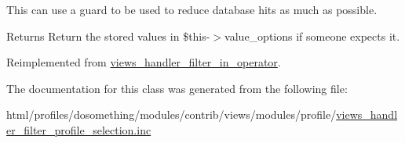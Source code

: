 This can use a guard to be used to reduce database hits as much as possible.

\begin{DoxyReturn}{Returns}
Return the stored values in \$this-\/$>$value\_\-options if someone expects it. 
\end{DoxyReturn}


Reimplemented from \hyperlink{classviews__handler__filter__in__operator_aa5b5df6d90f4359ed28c0c446bdc81a6}{views\_\-handler\_\-filter\_\-in\_\-operator}.

The documentation for this class was generated from the following file:\begin{DoxyCompactItemize}
\item 
html/profiles/dosomething/modules/contrib/views/modules/profile/\hyperlink{views__handler__filter__profile__selection_8inc}{views\_\-handler\_\-filter\_\-profile\_\-selection.inc}\end{DoxyCompactItemize}
